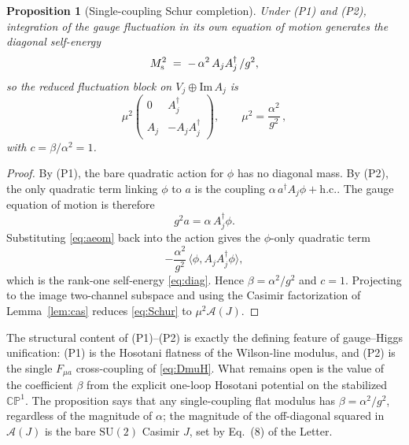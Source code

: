 \documentclass[aps,prd,onecolumn,superscriptaddress,nofootinbib,reprint]{revtex4-2}
\newtheorem{proposition}{Proposition}
\newcommand{\cA}{\mathcal{A}}
\newcommand{\SU}{\mathrm{SU}}
\newcommand{\CP}{\mathbb{CP}}
\begin{document}
\begin{proposition}[Single-coupling Schur completion]
\label{prop:c1-app}
Under (P1) and (P2), integration of the gauge fluctuation in its own
equation of motion generates the diagonal self-energy
\begin{equation}
  M_{\rm s}^{2}\;=\;-\,\alpha^{2}\,A_{j}A_{j}^{\dagger}\,/g^{2},
\label{eq:diag}
\end{equation}
so the reduced fluctuation block on $V_{j}\oplus\mathrm{Im}\,A_{j}$ is
\begin{equation}
  \mu^{2}
  \begin{pmatrix} 0 & A_{j}^{\dagger}\\ A_{j} & -A_{j}A_{j}^{\dagger}\end{pmatrix},
  \qquad
  \mu^{2}=\frac{\alpha^{2}}{g^{2}}\,,
\label{eq:Schur}
\end{equation}
with $c=\beta/\alpha^{2}=1$.
\end{proposition}

\begin{proof}
By (P1), the bare quadratic action for $\phi$ has no diagonal mass.
By (P2), the only quadratic term linking $\phi$ to $a$ is the coupling
$\alpha\,a^{\dagger}A_{j}\phi+\mathrm{h.c.}$.  The gauge equation of
motion is therefore
\begin{equation}
  g^{2}a=\alpha\,A_{j}^{\dagger}\phi.
\label{eq:aeom}
\end{equation}
Substituting \eqref{eq:aeom} back into the action gives the
$\phi$-only quadratic term
\begin{equation}
  -\frac{\alpha^{2}}{g^{2}}\,\langle\phi,A_{j}A_{j}^{\dagger}\phi\rangle,
\label{eq:tracedout}
\end{equation}
which is the rank-one self-energy \eqref{eq:diag}.  Hence
$\beta=\alpha^{2}/g^{2}$ and $c=1$.  Projecting to the image two-channel
subspace and using the Casimir factorization of
Lemma~\ref{lem:cas} reduces \eqref{eq:Schur} to $\mu^{2}\cA(J)$.
\end{proof}

The structural content of (P1)--(P2) is exactly the defining feature
of gauge--Higgs unification: (P1) is the Hosotani flatness of the
Wilson-line modulus, and (P2) is the single $F_{\mu a}$ cross-coupling of
\eqref{eq:DmuH}.  What remains open is the value of the coefficient
$\beta$ from the explicit one-loop Hosotani potential on the
stabilized $\CP^{1}$.  The proposition says that any single-coupling
flat modulus has $\beta=\alpha^{2}/g^{2}$, regardless of the magnitude
of $\alpha$; the magnitude of the off-diagonal squared in $\cA(J)$ is
the bare $\SU(2)$ Casimir $J$, set by Eq.~(8) of the Letter.
\end{document}
